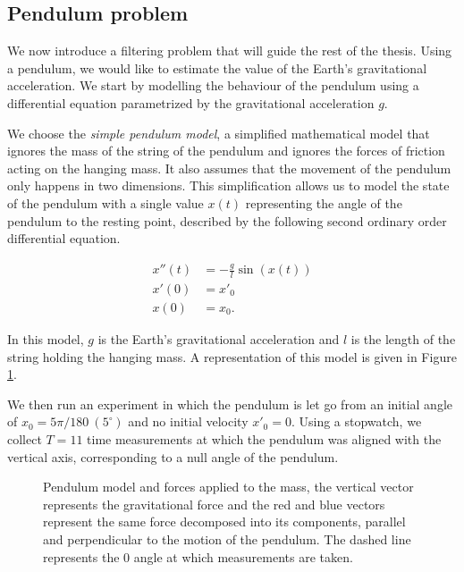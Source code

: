 \subsection{Pendulum problem}

We now introduce a filtering problem that will guide the rest of the thesis. Using a pendulum, we would like to estimate the value of the Earth's gravitational acceleration. We start by modelling the behaviour of the pendulum using a differential equation parametrized by the gravitational acceleration $g$.

We choose the \textit{simple pendulum model}, a simplified mathematical model that ignores the mass of the string of the pendulum and ignores the forces of friction acting on the hanging mass. It also assumes that the movement of the pendulum only happens in two dimensions. This simplification allows us to model the state of the pendulum with a single value $x(t)$ representing the angle of the pendulum to the resting point, described by the following second ordinary order differential equation.

\begin{equation}\label{pendulum-ode}
  \begin{aligned}
  x''(t) &= -\frac{g}{l}\sin(x(t))\\
  x'(0) &= x'_0\\
  x(0) &= x_0.
  \end{aligned}
\end{equation}

In this model, $g$ is the Earth's gravitational acceleration and $l$ is the length of the string holding the hanging mass. A representation of this model is given in Figure \ref{pendulum-fig}.

We then run an experiment in which the pendulum is let go from an initial angle of $x_0 = 5\pi/180\ (5^\circ)$ and no initial velocity $x'_0 = 0$. Using a stopwatch, we collect $T=11$ time measurements at which the pendulum was aligned with the vertical axis, corresponding to a null angle of the pendulum.

\begin{figure}\label{pendulum-fig}
  \centering
  
  \caption{Pendulum model and forces applied to the mass, the vertical vector represents the gravitational force and the red and blue vectors represent the same force decomposed into its components, parallel and perpendicular to the motion of the pendulum. The dashed line represents the $0$ angle at which measurements are taken.}
\end{figure}

